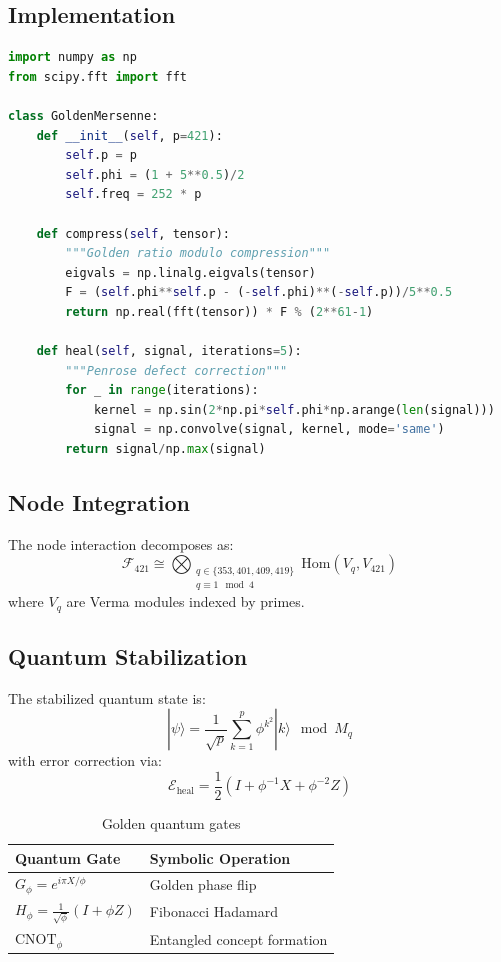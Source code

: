 \documentclass[12pt]{article}
\begin{document}
\subsection{Implementation}
\begin{lstlisting}[language=Python,caption={Golden Mersenne Engine}]
import numpy as np
from scipy.fft import fft

class GoldenMersenne:
    def __init__(self, p=421):
        self.p = p
        self.phi = (1 + 5**0.5)/2
        self.freq = 252 * p
        
    def compress(self, tensor):
        """Golden ratio modulo compression"""
        eigvals = np.linalg.eigvals(tensor)
        F = (self.phi**self.p - (-self.phi)**(-self.p))/5**0.5
        return np.real(fft(tensor)) * F % (2**61-1)
    
    def heal(self, signal, iterations=5):
        """Penrose defect correction"""
        for _ in range(iterations):
            kernel = np.sin(2*np.pi*self.phi*np.arange(len(signal)))
            signal = np.convolve(signal, kernel, mode='same')
        return signal/np.max(signal)
\end{lstlisting}

\subsection{Node Integration}
\begin{theorem}
The node interaction decomposes as:
\[
\mathcal{F}_{421} \cong \bigotimes_{\substack{q\in\{353,401,409,419\} \\ q\equiv1\mod4}} \text{Hom}(V_q,V_{421})
\]
where $V_q$ are Verma modules indexed by primes.
\end{theorem}

\subsection{Quantum Stabilization}
\begin{definition}
The stabilized quantum state is:
\[
|\psi\rangle = \frac{1}{\sqrt{p}}\sum_{k=1}^p \phi^{k^2}|k\rangle \mod M_q
\]
with error correction via:
\[
\mathcal{E}_{\text{heal}} = \frac{1}{2}(I + \phi^{-1}X + \phi^{-2}Z)
\]
\end{definition}

\begin{table}[h]
\centering
\begin{tabular}{ll}
\toprule
\textbf{Quantum Gate} & \textbf{Symbolic Operation} \\
\midrule
$G_\phi = e^{i\pi X/\phi}$ & Golden phase flip \\
$H_\phi = \frac{1}{\sqrt{\phi}}(I+\phi Z)$ & Fibonacci Hadamard \\
$\text{CNOT}_\phi$ & Entangled concept formation \\
\bottomrule
\end{tabular}
\caption{Golden quantum gates}
\end{table}
\end{document}
